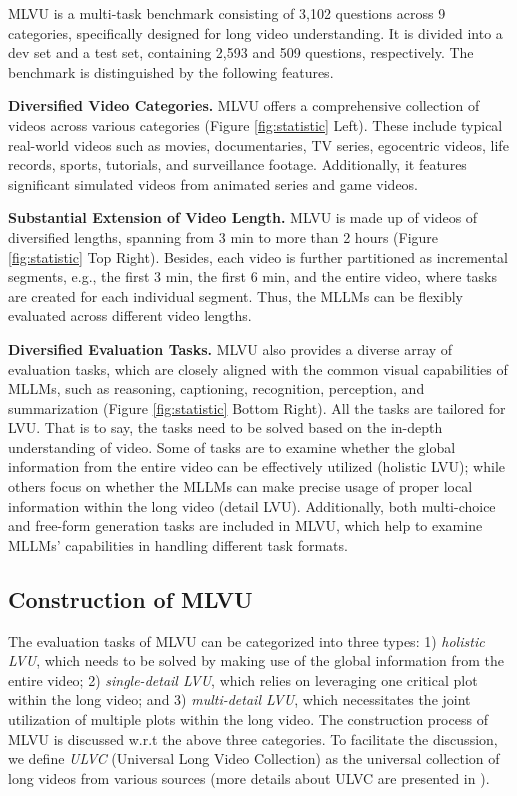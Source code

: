 MLVU is a multi-task benchmark consisting of 3,102 questions across 9 categories, specifically designed for long video understanding. It is divided into a dev set and a test set, containing 2,593 and 509 questions, respectively. The benchmark is distinguished by the following features.   

\textbf{Diversified Video Categories.} MLVU offers a comprehensive collection of videos across various categories (Figure \ref{fig:statistic} Left). These include typical real-world videos such as movies, documentaries, TV series, egocentric videos, life records, sports, tutorials, and surveillance footage. Additionally, it features significant simulated videos from animated series and game videos.

\textbf{Substantial Extension of Video Length.} MLVU is made up of videos of diversified lengths, spanning from 3 min to more than 2 hours (Figure \ref{fig:statistic} Top Right). Besides, each video is further partitioned as incremental segments, e.g., the first 3 min, the first 6 min, and the entire video, where tasks are created for each individual segment. Thus, the MLLMs can be flexibly evaluated across different video lengths. 

\textbf{Diversified Evaluation Tasks.} MLVU also provides a diverse array of evaluation tasks, which are closely aligned with the common visual capabilities of MLLMs, such as reasoning, captioning, recognition, perception, and summarization (Figure \ref{fig:statistic} Bottom Right). All the tasks are tailored for LVU. That is to say, the tasks need to be solved based on the in-depth understanding of video. Some of tasks are to examine whether the global information from the entire video can be effectively utilized (holistic LVU); while others focus on whether the MLLMs can make precise usage of proper local information within the long video (detail LVU). Additionally, both multi-choice and free-form generation tasks are included in MLVU, which help to examine MLLMs' capabilities in handling different task formats. 

\subsection{Construction of MLVU}
\label{sec:MLVU-construction}

The evaluation tasks of MLVU can be categorized into three types: 1) \textit{holistic LVU}, which needs to be solved by making use of the global information from the entire video; 2) \textit{single-detail LVU}, which relies on leveraging one critical plot within the long video; and 3) \textit{multi-detail LVU}, which necessitates the joint utilization of multiple plots within the long video. The construction process of MLVU is discussed w.r.t the above three categories. To facilitate the discussion, we define \textit{ULVC} (Universal Long Video Collection) as the universal collection of long videos from various sources (more details about ULVC are presented in ).

